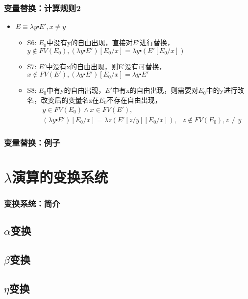\documentclass[CJKutf8,compress,hyperref]{beamer}
\begin{document}
\begin{CJK}{UTF8}{song}
\begin{frame}
  \frametitle{ 变量替换：计算规则2} 
  \begin{itemize}
  \item  $E \equiv \lambda y \centerdot E', x \neq y$ 
    \begin{itemize}
    \item {S6:} $E_0$中没有y的自由出现，直接对$E'$进行替换，
      $ y \not \in FV(E_0),   (\lambda y
      \centerdot E') [E_0/x] = \lambda y \centerdot
      (E'[E_0/x]) $
    \item {S7:} $E'$中没有x的自由出现，则E'没有可替换，
      $ x \not \in FV(E'),   (\lambda y \centerdot E')
      [E_0/x] = \lambda y
      \centerdot E' $
    \item{S8:}  $E_0$中有y的自由出现，$E'$中有x的自由出现，则需要对$E_0$中的y进行改名，改变后的变量名z在$E_0$不存在自由出现，   
      \begin{eqnarray*}
        &y \in FV(E_0) \wedge x \in FV(E'), & \\   
        & (\lambda y  \centerdot  E') [E_0/x] 
          = \lambda z  (E'[z/y]  [E_0/x]),  
                                            & z \not \in FV(E_0), z \neq y   
      \end{eqnarray*} 
    \end{itemize}
  \end{itemize}
\end{frame}

\begin{frame}
    \frametitle{ 变量替换：例子} 
\end{frame}

\section{$\lambda$演算的变换系统}
\begin{frame}
  \frametitle{变换系统：简介} 
\end{frame}

\subsection{$\alpha$变换}
\subsection{$\beta$变换}
\subsection{$\eta$变换}


\end{CJK}
\end{document}
